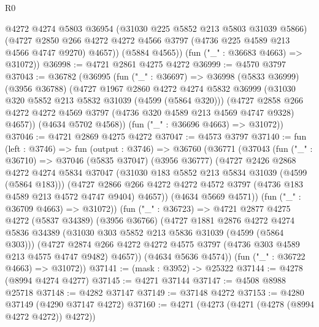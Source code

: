 \begin{lexlean}{R0}
\begin{coremodule}
          @4272
          @4274
          @5803
          @36954
          (@31030 @225 @5852 @213 @5803 @31039 @5866)
          (@4727
            @2850
            @266
            @4272
            @4272
            @4566
            @3797
            (@4736 @225 @4589 @213 @4566 @4747 @9270)
            @4657))
        (@5884 @4565))
      (fun ("_" : @36683 @4663) => @31072))
@36998 := @4721 @2861 @4275 @4272
@36999 := @4570 @3797
@37043 := @36782
    (@36995
      (fun ("_" : @36697) =>
      @36998
        (@5833 @36999)
        (@3956 @36788)
        (@4727
          @1967
          @2860
          @4272
          @4274
          @5832
          @36999
          (@31030 @320 @5852 @213 @5832 @31039 (@4599 (@5864 @320)))
          (@4727
            @2858
            @266
            @4272
            @4272
            @4569
            @3797
            (@4736 @320 @4589 @213 @4569 @4747 @9328)
            @4657))
        (@4634 @5702 @4568))
      (fun ("_" : @36696 @4663) => @31072))
@37046 := @4721 @2869 @4275 @4272
@37047 := @4573 @3797
@37140 := fun (left : @3746) =>
  fun (output : @3746) =>
  @36760
    (@36771
      (@37043
        (fun ("_" : @36710) =>
        @37046
          (@5835 @37047)
          (@3956 @36777)
          (@4727
            @2426
            @2868
            @4272
            @4274
            @5834
            @37047
            (@31030 @183 @5852 @213 @5834 @31039 (@4599 (@5864 @183)))
            (@4727
              @2866
              @266
              @4272
              @4272
              @4572
              @3797
              (@4736 @183 @4589 @213 @4572 @4747 @9404)
              @4657))
          (@4634 @5669 @4571))
        (fun ("_" : @36709 @4663) => @31072))
      (fun ("_" : @36723) =>
      @4721
        @2877
        @4275
        @4272
        (@5837 @34389)
        (@3956 @36766)
        (@4727
          @1881
          @2876
          @4272
          @4274
          @5836
          @34389
          (@31030 @303 @5852 @213 @5836 @31039 (@4599 (@5864 @303)))
          (@4727
            @2874
            @266
            @4272
            @4272
            @4575
            @3797
            (@4736 @303 @4589 @213 @4575 @4747 @9482)
            @4657))
        (@4634 @5636 @4574))
      (fun ("_" : @36722 @4663) => @31072))
@37141 := (mask : @3952) -> @25322
@37144 := @4278 (@8994 @4274 @4277)
@37145 := @4271 @37144
@37147 := @4508 @8988 @25718
@37148 := @4282 @37147
@37149 := @37148 @4272
@37153 := @4280 @37149 (@4290 @37147 @4272)
@37160 := @4271 (@4273 (@4271 (@4278 (@8994 @4272 @4272)) @4272))

\end{coremodule}
\end{lexlean}
